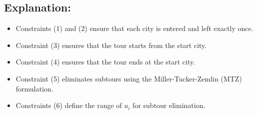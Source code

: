 \documentclass{article}
\begin{document}
\subsection*{Explanation:}
\begin{itemize}
    \item Constraints (1) and (2) ensure that each city is entered and left exactly once.
    \item Constraint (3) ensures that the tour starts from the start city.
    \item Constraint (4) ensures that the tour ends at the start city.
    \item Constraint (5) eliminates subtours using the Miller-Tucker-Zemlin (MTZ) formulation.
    \item Constraints (6) define the range of \( u_i \) for subtour elimination.
\end{itemize}
\end{document}
